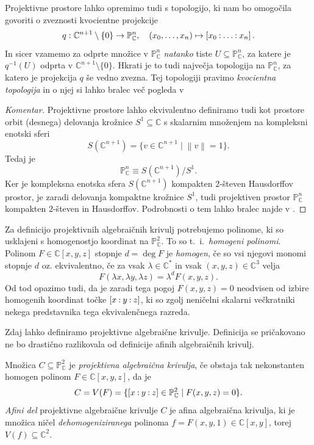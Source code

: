 \documentclass[mat1]{fmfdelo}
\numberwithin{equation}{section}
\newcommand{\C}{\mathbb C}
\newcommand{\PP}{\mathbb P}
\newcommand{\CM}{\mathbb C ^*}
\newcommand{\PC}{\mathbb{P}^2_\C}
\newcommand{\inv}{^{-1}}
\newcommand{\pcoor}[1]{%
\begingroup\lccode`~=`: \lowercase{\endgroup
\edef~}{\mathbin{\mathchar\the\mathcode`:}\nobreak}%
\left[%
\begingroup
\mathcode`:=\string"8000
#1%
\endgroup
\right]%
}
\theoremstyle{definition}
\newenvironment{komentar}[1][Komentar]{\begin{proof}[#1]\let\qed\relax}{\end{proof}}
\begin{document}
\begin{opomba} 
    \label{topologija na projektivnih prostorih}   
    Projektivne prostore lahko opremimo tudi s topologijo, ki nam bo omogočila govoriti o zveznosti kvocientne projekcije
    \[
        q : \C^{n+1}\setminus\{0\} \to \PP_\C^n, \quad (x_0, \ldots, x_n) \mapsto \pcoor{x_0 : \ldots : x_n}. 
    \]
    In sicer vzamemo za odprte množice v $\PP_\C^n$ \emph{natanko} tiste $U \subseteq \PP_\C^n$, za katere je $q\inv(U)$ odprta v $\C^{n+1}\setminus\{0\}$. Hkrati je to tudi največja topologija na $\PP_\C^n$, za katero je projekcija $q$ še vedno zvezna.  
    Tej topologiji pravimo \emph{kvocientna topologija} in o njej si lahko bralec več pogleda v \cite[poglavje 3.2.]{MrcunTop}
\end{opomba}

\begin{komentar}
    Projektivne prostore lahko ekvivalentno definiramo tudi kot prostore orbit (desnega) delovanja krožnice $S^1 \subseteq \C$ s skalarnim množenjem na kompleksni enotski sferi 
    \[
        S(\C^{n+1}) = \{v \in \C^{n+1} \mid \left\lVert v\right\rVert = 1\}.
    \]
    Tedaj je
    \[
        \PP_\C^n \equiv S(\C^{n+1})/S^1.
    \]
    Ker je kompleksna enotska sfera $S(\C^{n+1})$ kompakten $2$-števen Hausdorffov prostor, je zaradi delovanja kompaktne krožnice $S^1$, tudi projektiven prostor $\PP_\C^n$ kompakten $2$-števen in Hausdorffov. Podrobnosti o tem lahko bralec najde v 
    \cite[Zgled 3.43. (2)]{MrcunTop}.
\end{komentar}

Za definicijo projektivnih algebraičnih krivulj potrebujemo  polinome, ki so usklajeni s homogenostjo koordinat na $\PC$. To so t.~i.\ \emph{homogeni polinomi}. Polinom $F \in \C[x,y,z]$ stopnje $d = \deg F$ je \emph{homogen}, če so vsi njegovi monomi stopnje $d$ oz. ekvivalentno, če za vsak $\lambda \in \CM$ in vsak $(x,y,z) \in \C^3$ velja
\[
    F(\lambda x, \lambda y, \lambda z) = \lambda^d F(x,y,z). 
\]
Od tod opazimo tudi, da je zaradi tega pogoj $F(x,y,z) = 0$ neodvisen od izbire homogenih koordinat točke $\pcoor{x : y : z}$, ki so zgolj neničelni skalarni večkratniki nekega predstavnika tega ekvivalenčnega razreda.  

Zdaj lahko definiramo projektivne algebraične krivulje. Definicija se pričakovano ne bo drastično razlikovala od definicije afinih algebraičnih krivulj.

\begin{definicija}
    Množica $C \subseteq \PC$ je \emph{projektivna algebraična krivulja}, če obstaja tak nekonstanten homogen polinom $F \in \C[x,y,z]$, da je
    \[
        C = V(F) = \{\pcoor{x: y: z} \in \PC \mid F(x,y,z) = 0\}. 
    \]
    \emph{Afini del} projektivne algebraične krivulje $C$ je afina algebraična krivulja, ki je množica ničel \emph{dehomogeniziranega} polinoma $f = F(x,y,1) \in \C[x,y]$, torej $V(f) \subseteq \C^2$. 
\end{definicija}
\end{document}
